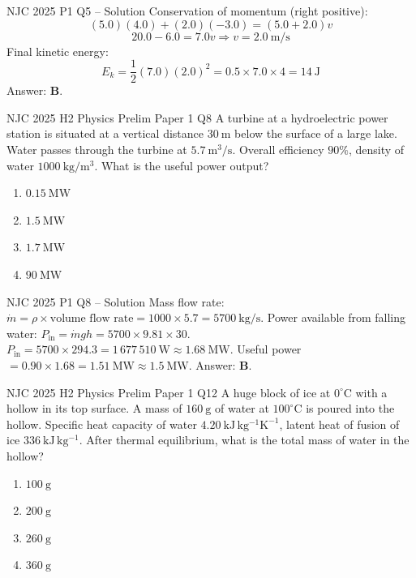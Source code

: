 \documentclass[11pt]{beamer}
\begin{document}
\begin{frame}{NJC 2025 P1 Q5 – Solution}
Conservation of momentum (right positive):
\[ (5.0)(4.0) + (2.0)(-3.0) = (5.0+2.0)v \]
\[ 20.0 - 6.0 = 7.0v \Rightarrow v = 2.0\ \mathrm{m/s} \]
Final kinetic energy:
\[ E_k = \frac12 (7.0)(2.0)^2 = 0.5\times7.0\times4 = 14\ \mathrm{J} \]
Answer: \textbf{B}.
\end{frame}

\begin{frame}[shrink=15]{NJC 2025 H2 Physics Prelim Paper 1 Q8}
A turbine at a hydroelectric power station is situated at a vertical distance $30\ \mathrm{m}$ below the surface of a large lake. Water passes through the turbine at $5.7\ \mathrm{m^3/s}$. Overall efficiency $90\%$, density of water $1000\ \mathrm{kg/m^3}$. What is the useful power output?
\begin{enumerate}[A]
    \item $0.15\ \mathrm{MW}$
    \item $1.5\ \mathrm{MW}$
    \item $1.7\ \mathrm{MW}$
    \item $90\ \mathrm{MW}$
\end{enumerate}
\end{frame}

\begin{frame}{NJC 2025 P1 Q8 – Solution}
Mass flow rate: $\dot{m} = \rho \times \text{volume flow rate} = 1000\times5.7 = 5700\ \mathrm{kg/s}$.
Power available from falling water: $P_{\text{in}} = \dot{m} g h = 5700\times9.81\times30$.
$P_{\text{in}} = 5700\times294.3 = 1\,677\,510\ \mathrm{W} \approx 1.68\ \mathrm{MW}$.
Useful power $= 0.90 \times 1.68 = 1.51\ \mathrm{MW} \approx 1.5\ \mathrm{MW}$.
Answer: \textbf{B}.
\end{frame}

\begin{frame}[shrink=15]{NJC 2025 H2 Physics Prelim Paper 1 Q12}
A huge block of ice at $0^\circ\mathrm{C}$ with a hollow in its top surface. A mass of $160\ \mathrm{g}$ of water at $100^\circ\mathrm{C}$ is poured into the hollow. Specific heat capacity of water $4.20\ \mathrm{kJ\,kg^{-1}K^{-1}}$, latent heat of fusion of ice $336\ \mathrm{kJ\,kg^{-1}}$. After thermal equilibrium, what is the total mass of water in the hollow?
\begin{enumerate}[A]
    \item $100\ \mathrm{g}$
    \item $200\ \mathrm{g}$
    \item $260\ \mathrm{g}$
    \item $360\ \mathrm{g}$
\end{enumerate}
\end{frame}
\end{document}
